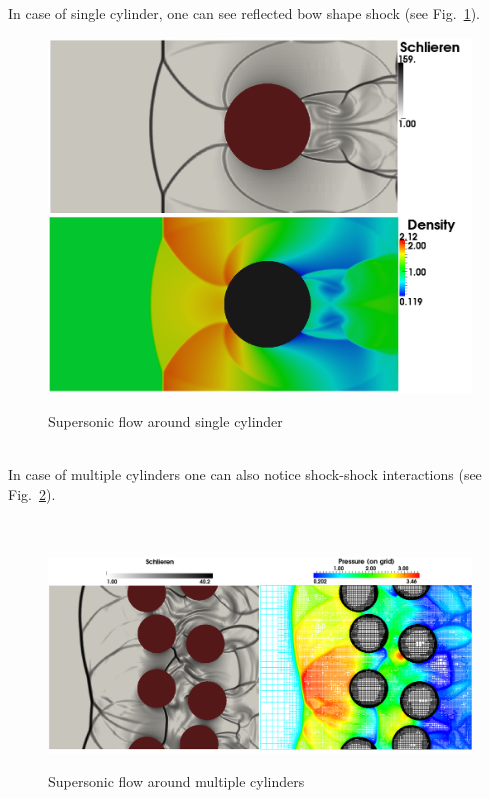 In case of single cylinder, one can see reflected bow shape shock (see Fig.~\ref{fig:single_res}).
\begin{figure}[h!]
\centering \includegraphics[scale=0.3]{fig/single_res.png}\\
\caption{Supersonic flow around single cylinder \label{fig:single_res}}
\end{figure} \\
In case of multiple cylinders one can also notice shock-shock interactions (see Fig.~\ref{fig:mult_res}). \\\\\\
\begin{figure}[t]
\centering \includegraphics[scale=0.35]{fig/mult_res.png}\\
\caption{Supersonic flow around multiple cylinders \label{fig:mult_res}}
\end{figure}
